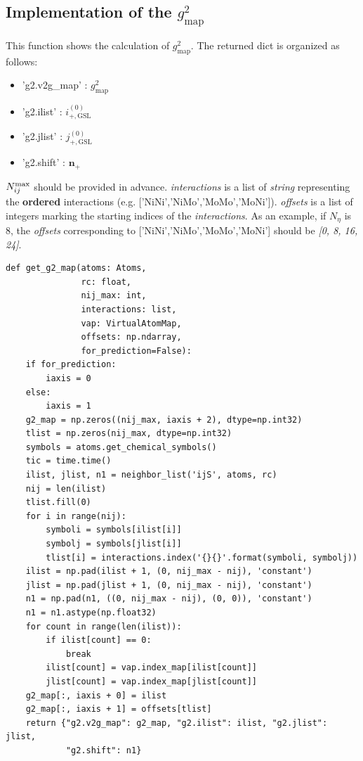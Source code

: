\documentclass[final,1p,times]{elsarticle}
\begin{document}
% 
%
\subsection{Implementation of the \texorpdfstring{$g^2_{\mathrm{map}}$}{g2map}}

This function shows the calculation of $g^2_{\mathrm{map}}$. The returned dict 
is organized as follows: 
\begin{itemize}
    \item \textmd{'g2.v2g\_map'} : $g^2_{\mathrm{map}}$
    \item \textmd{'g2.ilist'} : $i^{(0)}_{\mathrm{+,GSL}}$
    \item \textmd{'g2.jlist'} : $j^{(0)}_{\mathrm{+,GSL}}$
    \item \textmd{'g2.shift'} : $\mathbf{n_+}$
\end{itemize}
$N_{ij}^{\mathrm{max}}$ should be provided in advance. \textit{interactions} is a list of 
\textit{string} representing the \textbf{ordered} interactions (e.g. 
\textmd{['NiNi','NiMo','MoMo','MoNi']}). \textit{offsets} is a list of integers 
marking the starting indices of the \textit{interactions}. As an example, if 
$N_{\eta}$ is 8, the \textit{offsets} corresponding to 
\textmd{['NiNi','NiMo','MoMo','MoNi']} should be \textit{[0, 8, 16, 24]}.

\begin{verbatim}
def get_g2_map(atoms: Atoms,
               rc: float,
               nij_max: int,
               interactions: list,
               vap: VirtualAtomMap,
               offsets: np.ndarray,
               for_prediction=False):
    if for_prediction:
        iaxis = 0
    else:
        iaxis = 1
    g2_map = np.zeros((nij_max, iaxis + 2), dtype=np.int32)
    tlist = np.zeros(nij_max, dtype=np.int32)
    symbols = atoms.get_chemical_symbols()
    tic = time.time()
    ilist, jlist, n1 = neighbor_list('ijS', atoms, rc)
    nij = len(ilist)
    tlist.fill(0)
    for i in range(nij):
        symboli = symbols[ilist[i]]
        symbolj = symbols[jlist[i]]
        tlist[i] = interactions.index('{}{}'.format(symboli, symbolj))
    ilist = np.pad(ilist + 1, (0, nij_max - nij), 'constant')
    jlist = np.pad(jlist + 1, (0, nij_max - nij), 'constant')
    n1 = np.pad(n1, ((0, nij_max - nij), (0, 0)), 'constant')
    n1 = n1.astype(np.float32)
    for count in range(len(ilist)):
        if ilist[count] == 0:
            break
        ilist[count] = vap.index_map[ilist[count]]
        jlist[count] = vap.index_map[jlist[count]]
    g2_map[:, iaxis + 0] = ilist
    g2_map[:, iaxis + 1] = offsets[tlist]
    return {"g2.v2g_map": g2_map, "g2.ilist": ilist, "g2.jlist": jlist,
            "g2.shift": n1}
\end{verbatim}
\end{document}
